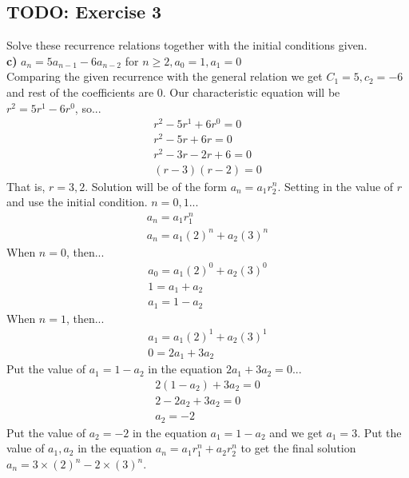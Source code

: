 \documentclass[12pt]{article}
\begin{document}
    \subsection{TODO: Exercise 3}
    Solve these recurrence relations together with the initial conditions given.\\
    \textbf{c)} $ a_n=5a_{n-1} - 6a_{n-2} $ for $ n \geq 2, a_0=1, a_1=0 $\\
    Comparing the given recurrence with the general relation we get $C_1=5,c_2=-6$ and rest of the coefficients are $0$.
    Our characteristic equation will be $r^2=5r^1-6r^0$, so...
    \begin{equation}
        \begin{split}
            r^2-5r^1+6r^0=0\\
            r^2-5r+6r=0\\
            r^2-3r-2r+6=0\\
            (r-3)(r-2)=0
        \end{split}
    \end{equation}
    That is, $r=3,2$.
    Solution will be of the form $a_n=a_1r_2^n$. Setting in the value of $r$ and use the initial condition.
    $n=0,1$...\\
    \begin{equation}
        \begin{split}
            a_n=a_1r_1^n\\
            a_n=a_1(2)^n+a_2(3)^n
        \end{split}
    \end{equation}
    When $n=0$, then...
    \begin{equation}
        \begin{split}
            a_0=a_1(2)^0+a_2(3)^0\\
            1=a_1+a_2\\
            a_1=1-a_2
        \end{split}
    \end{equation}
    When $n=1$, then...
    \begin{equation}
        \begin{split}
            a_1=a_1(2)^1+a_2(3)^1\\
            0=2a_1+3a_2
        \end{split}
    \end{equation}
    Put the value of $a_1=1-a_2$ in the equation $2a_1+3a_2=0$...
    \begin{equation}
        \begin{split}
            2(1-a_2)+3a_2=0\\
            2-2a_2+3a_2=0\\
            a_2=-2
        \end{split}
    \end{equation}
    Put the value of $a_2=-2$ in the equation $a_1=1-a_2$ and we get $a_1=3$.
    Put the value of $a_1,a_2$ in the equation $a_n=a_1r_1^n+a_2r_2^n$ to get the final solution $a_n=3 \times (2)^n-2 \times (3)^n$.
\end{document}
